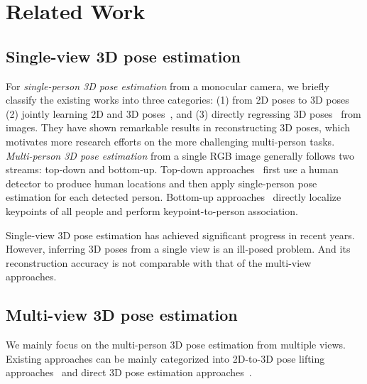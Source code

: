 \documentclass[10pt,twocolumn,letterpaper]{article}
\begin{document}
\section{Related Work}

\subsection{Single-view 3D pose estimation}

For \emph{single-person 3D pose estimation} from a monocular camera, we briefly classify the existing works into three categories: (1) from 2D poses to 3D poses~\cite{chen20173d,martinez2017simple, zhang2020learning} (2) jointly learning 2D and 3D poses~\cite{nie2017monocular,pavlakos2018ordinal}, and (3) directly regressing 3D poses~\cite{pavlakos2017coarse, pymaf2021} from images. They have shown remarkable results in reconstructing 3D poses, which motivates more research efforts on the more challenging multi-person tasks. \emph{Multi-person 3D pose estimation} from a single RGB image generally follows two streams: top-down and bottom-up. Top-down approaches~\cite{dabral2018learning,moon2019camera,zanfir2018monocular} first use a human detector to produce human locations and then apply single-person pose estimation for each detected person. Bottom-up approaches~\cite{mehta2018single,zanfir2018deep} directly localize keypoints of all people and perform keypoint-to-person association. 

Single-view 3D pose estimation has achieved significant progress in recent years. However, inferring 3D poses from a single view is an ill-posed problem. And its reconstruction accuracy is not comparable with that of the multi-view approaches.


\subsection{Multi-view 3D pose estimation}

We mainly focus on the multi-person 3D pose estimation from multiple views. Existing approaches can be mainly categorized into 2D-to-3D pose lifting approaches~\cite{amin2013multi,belagiannis20143d,belagiannis20153d,bridgeman2019multi,dong2019fast,ershadi2018multiple,huang2020end,lin2021multi,zhang20204d} and direct 3D pose estimation approaches~\cite{tu2020voxelpose}. 
\end{document}

